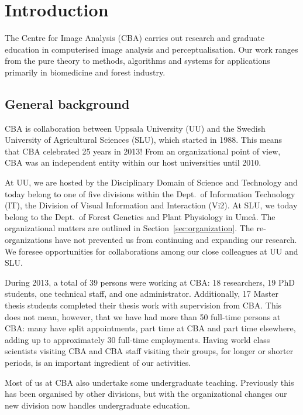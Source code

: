 \section{Introduction}
\noindent 
The Centre for Image Analysis (CBA) carries out research and graduate education in computerised image analysis and perceptualisation. Our work ranges from the pure theory to methods, algorithms and systems for applications primarily in biomedicine and forest industry.

\subsection{General background}\label{sect:background}

\noindent 
CBA is collaboration between Uppsala University (UU) and the Swedish University of Agricultural Sciences (SLU), which started in 1988. This means that CBA celebrated 25 years in 2013! From an organizational point of view, CBA was an independent entity within our host universities until 2010.

At UU, we are hosted by the Disciplinary Domain of Science and Technology and today belong to one of five divisions within the Dept.~of Information Technology (IT), the Division of Visual Information and Interaction (Vi2). At SLU, we today belong to the Dept.~of Forest Genetics and Plant Physiology in Ume{\aa}. The organizational matters are outlined in Section~\ref{sec:organization}. The re-organizations have not prevented us from continuing and expanding our research.
 We foresee opportunities for collaborations among our close colleagues at UU and SLU. 

During 2013, a total of 39 persons were working at CBA: 18 researchers, 19 PhD students, one technical staff, and one administrator. Additionally, 17 Master thesis students completed their thesis work with supervision from CBA. This does not mean, however, that we have had more than 50 full-time persons at CBA: many have split appointments, part time at CBA and part time elsewhere, adding up to approximately 30 full-time employments. Having world class scientists visiting CBA and CBA staff visiting their groups, for longer or shorter periods, is an important ingredient of our activities. 

Most of us at CBA also undertake some undergraduate teaching. Previously this has been organised by other divisions, but with the organizational changes our new division now handles undergraduate education. 

